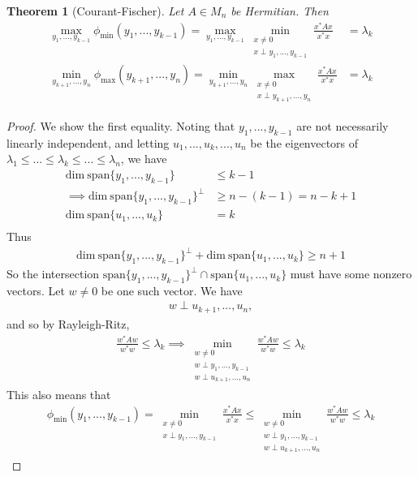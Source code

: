 \documentclass[11pt]{article}
\theoremstyle{plain}
\newtheorem{thm}{Theorem}[section]
\theoremstyle{definition}
\theoremstyle{remark}
\begin{document}
\begin{thm}[Courant-Fischer]
    Let $A \in M_n$ be Hermitian. Then
    \begin{align*}
        \max_{y_1 ,..., y_{k-1}} \phi_{\min}(y_1, ..., y_{k-1}) = \max_{y_1 ,..., y_{k-1}} \min_{\substack{x \neq 0 \\ x \perp y_1 ,..., y_{k-1}}} \frac{x^* A x}{x^* x} &= \lambda_k\\
        \min_{y_{k+1} ,..., y_n} \phi_{\max}(y_{k+1}, ..., y_n) = \min_{y_{k+1} ,..., y_n} \max_{\substack{x \neq 0 \\ x \perp y_{k+1} ,..., y_n}} \frac{x^* A x}{x^* x} &= \lambda_k
    \end{align*}
\end{thm}
\begin{proof}
    We show the first equality. Noting that $y_1, ..., y_{k-1}$ are not necessarily linearly independent, and letting $u_1, ..., u_k, ..., u_n$ be the eigenvectors of $\lambda_1 \leq ... \leq \lambda_k \leq ... \leq \lambda_n$, we have
    \begin{align*}
        \text{dim} \ \text{span}\{y_1, ..., y_{k-1}\} &\leq k - 1\\
        \implies \text{dim} \ \text{span}\{y_1, ..., y_{k-1}\}^{\perp} &\geq n - (k - 1) = n - k + 1\\
        \text{dim} \ \text{span}\{u_1, ..., u_k\} &= k\\
    \end{align*}
    Thus
    \begin{align*}
        \text{dim} \ \text{span}\{y_1, ..., y_{k-1}\}^{\perp} + \text{dim} \ \text{span}\{u_1, ..., u_k\} \geq n + 1
    \end{align*}
    So the intersection $\text{span}\{y_1, ..., y_{k-1}\}^{\perp} \cap \text{span}\{u_1, ..., u_k\}$ must have some nonzero vectors. Let $w \neq 0$ be one such vector. We have
    \begin{align*}
        w \perp u_{k+1}, ..., u_n,
    \end{align*}
    and so by Rayleigh-Ritz,
    \begin{align*}
        \frac{w^* A w}{w^* w} \leq \lambda_k \implies \min_{\substack{w \neq 0 \\ w \perp y_1 ,..., y_{k-1} \\ w \perp u_{k+1}, ..., u_n}} \frac{w^* A w}{w^* w} \leq \lambda_k
    \end{align*}
    This also means that
    \begin{align*}
        \phi_{\min}(y_1, ..., y_{k-1}) = \min_{\substack{x \neq 0 \\ x \perp y_1 ,..., y_{k-1}}} \frac{x^* A x}{x^* x} \leq \min_{\substack{w \neq 0 \\ w \perp y_1 ,..., y_{k-1} \\ w \perp u_{k+1}, ..., u_n}} \frac{w^* A w}{w^* w} \leq \lambda_k

\end{align*}
\end{proof}
\end{document}
